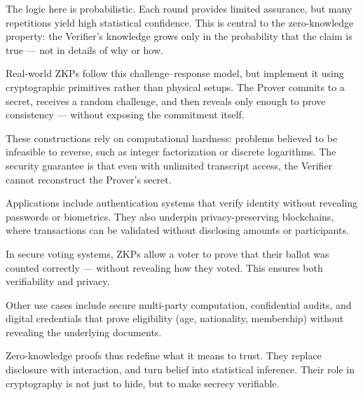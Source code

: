 The logic here is probabilistic. Each round provides limited assurance, but many repetitions yield high statistical confidence. This is central to the zero-knowledge property: the Verifier's knowledge grows only in the probability that the claim is true — not in details of why or how.

Real-world ZKPs follow this challenge–response model, but implement it using cryptographic primitives rather than physical setups. The Prover commits to a secret, receives a random challenge, and then reveals only enough to prove consistency — without exposing the commitment itself.

These constructions rely on computational hardness: problems believed to be infeasible to reverse, such as integer factorization or discrete logarithms. The security guarantee is that even with unlimited transcript access, the Verifier cannot reconstruct the Prover’s secret.

Applications include authentication systems that verify identity without revealing passwords or biometrics. They also underpin privacy-preserving blockchains, where transactions can be validated without disclosing amounts or participants.

In secure voting systems, ZKPs allow a voter to prove that their ballot was counted correctly — without revealing how they voted. This ensures both verifiability and privacy.

Other use cases include secure multi-party computation, confidential audits, and digital credentials that prove eligibility (age, nationality, membership) without revealing the underlying documents.

Zero-knowledge proofs thus redefine what it means to trust. They replace disclosure with interaction, and turn belief into statistical inference. Their role in cryptography is not just to hide, but to make secrecy verifiable.
